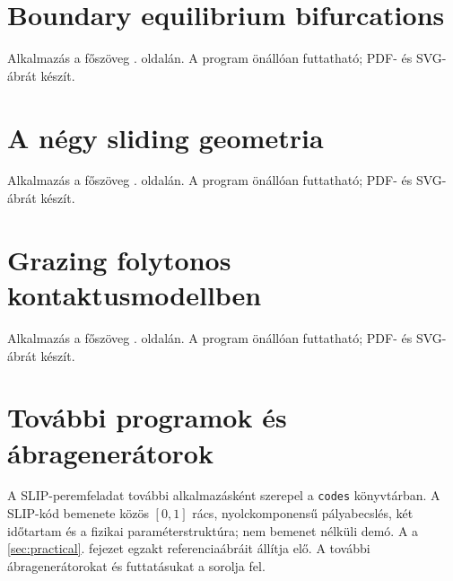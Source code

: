 \clearpage
\section{Boundary equilibrium bifurcations}\label{ap:beb}
Alkalmazás a főszöveg \pageref{use:beb}. oldalán. A program önállóan futtatható; PDF- és SVG-ábrát készít.


\clearpage
\section{A négy sliding geometria}\label{ap:sliding_types}
Alkalmazás a főszöveg \pageref{use:sliding_types}. oldalán. A program önállóan futtatható; PDF- és SVG-ábrát készít.


\clearpage
\section{Grazing folytonos kontaktusmodellben}\label{ap:continuous_grazing}
Alkalmazás a főszöveg \pageref{use:continuous_grazing}. oldalán. A program önállóan futtatható; PDF- és SVG-ábrát készít.


\clearpage
\section{További programok és ábragenerátorok}
A SLIP-peremfeladat további alkalmazásként szerepel a \texttt{codes} könyvtárban. A SLIP-kód bemenete közös $[0,1]$ rács, nyolckomponensű pályabecslés, két időtartam és a fizikai paraméterstruktúra; nem bemenet nélküli demó.
A  a \ref{sec:practical}. fejezet egzakt referenciaábráit állítja elő. A további ábragenerátorokat és futtatásukat a  sorolja fel.
